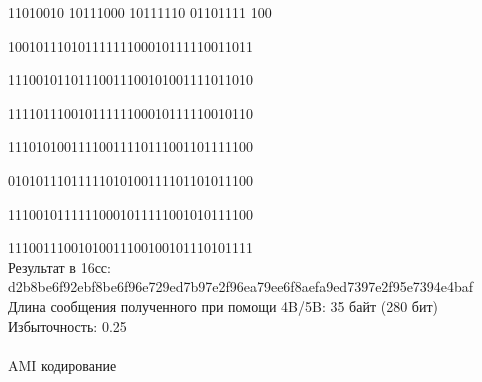 \documentclass{article}
\begin{document}
11010010 10111000 10111110 01101111 100

10010111010111111100010111110011011

11100101101110011100101001111011010

11110111001011111100010111110010110

11101010011110011110111001101111100

01010111011111010100111101101011100

11100101111110001011111001010111100

11100111001010011100100101110101111
\\
Результат в 16сс: d2b8be6f92ebf8be6f96e729ed7b97e2f96ea79ee6f8aefa9ed7397e2f95e7394e4baf
\\
Длина сообщения полученного при помощи 4B/5B: 35 байт (280 бит)
\\
Избыточность: 0.25
\\ \\
AMI кодирование
\begin{center}
\end{center}
\end{document}
